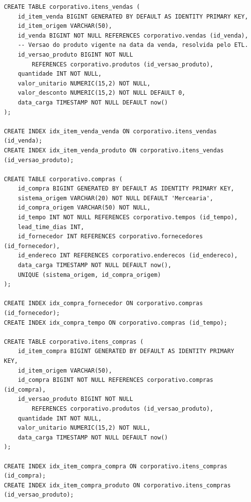 {\begin{verbatim}
CREATE TABLE corporativo.itens_vendas (
    id_item_venda BIGINT GENERATED BY DEFAULT AS IDENTITY PRIMARY KEY,
    id_item_origem VARCHAR(50),
    id_venda BIGINT NOT NULL REFERENCES corporativo.vendas (id_venda),
    -- Versao do produto vigente na data da venda, resolvida pelo ETL.
    id_versao_produto BIGINT NOT NULL
        REFERENCES corporativo.produtos (id_versao_produto),
    quantidade INT NOT NULL,
    valor_unitario NUMERIC(15,2) NOT NULL,
    valor_desconto NUMERIC(15,2) NOT NULL DEFAULT 0,
    data_carga TIMESTAMP NOT NULL DEFAULT now()
);

CREATE INDEX idx_item_venda_venda ON corporativo.itens_vendas (id_venda);
CREATE INDEX idx_item_venda_produto ON corporativo.itens_vendas (id_versao_produto);

CREATE TABLE corporativo.compras (
    id_compra BIGINT GENERATED BY DEFAULT AS IDENTITY PRIMARY KEY,
    sistema_origem VARCHAR(20) NOT NULL DEFAULT 'Mercearia',
    id_compra_origem VARCHAR(50) NOT NULL,
    id_tempo INT NOT NULL REFERENCES corporativo.tempos (id_tempo),
    lead_time_dias INT,
    id_fornecedor INT REFERENCES corporativo.fornecedores (id_fornecedor),
    id_endereco INT REFERENCES corporativo.enderecos (id_endereco),
    data_carga TIMESTAMP NOT NULL DEFAULT now(),
    UNIQUE (sistema_origem, id_compra_origem)
);

CREATE INDEX idx_compra_fornecedor ON corporativo.compras (id_fornecedor);
CREATE INDEX idx_compra_tempo ON corporativo.compras (id_tempo);

CREATE TABLE corporativo.itens_compras (
    id_item_compra BIGINT GENERATED BY DEFAULT AS IDENTITY PRIMARY KEY,
    id_item_origem VARCHAR(50),
    id_compra BIGINT NOT NULL REFERENCES corporativo.compras (id_compra),
    id_versao_produto BIGINT NOT NULL
        REFERENCES corporativo.produtos (id_versao_produto),
    quantidade INT NOT NULL,
    valor_unitario NUMERIC(15,2) NOT NULL,
    data_carga TIMESTAMP NOT NULL DEFAULT now()
);

CREATE INDEX idx_item_compra_compra ON corporativo.itens_compras (id_compra);
CREATE INDEX idx_item_compra_produto ON corporativo.itens_compras (id_versao_produto);
\end{verbatim}
}
